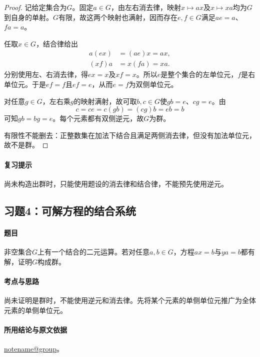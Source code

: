 \documentclass[UTF8,a4paper,11pt,fontset=windows]{ctexart}
\makeatletter
\newcommand{\noteref}[1]{\hyperref[note:#1]{\csname notename@#1\endcsname}}
\newcommand{\exref}[2]{\hyperref[ex:#1:#2]{第#1章习题#2}}
\makeatother
\begin{document}
\begin{proof}
记给定集合为$G$。固定$a\in G$，由左右消去律，映射$x\mapsto ax$及$x\mapsto xa$均为$G$到自身的单射。$G$有限，故这两个映射也满射，因而存在$e,f\in G$满足$ae=a$、$fa=a$。

任取$x\in G$，结合律给出
\begin{align*}
a(ex)&=(ae)x=ax,\\
(xf)a&=x(fa)=xa.
\end{align*}
分别使用左、右消去律，得$ex=x$及$xf=x$。所以$e$是整个集合的左单位元，$f$是右单位元。于是$ef=f$且$ef=e$，从而$e=f$为双侧单位元。

对任意$g\in G$，左右乘$g$的映射满射，故可取$b,c\in G$使$gb=e$、$cg=e$。由
\[
c=ce=c(gb)=(cg)b=eb=b
\]
可知$gb=bg=e$。每个元素都有双侧逆元，故$G$为群。

有限性不能删去：正整数集在加法下结合且满足两侧消去律，但没有加法单位元，故不是群。
\end{proof}

\paragraph{复习提示}
尚未构造出群时，只能使用题设的消去律和结合律，不能预先使用逆元。


\subsection{习题4：\texorpdfstring{可解方程的结合系统}{可解方程的结合系统}}
\label{ex:1:4}

\paragraph{题目}
非空集合$G$上有一个结合的二元运算。若对任意$a,b\in G$，方程$ax=b$与$ya=b$都有解，证明$G$构成群。

\paragraph{考点与思路}
尚未证明是群时，不能使用逆元和消去律。先将某个元素的单侧单位元推广为全体元素的单侧单位元。

\paragraph{所用结论与原文依据}
\noteref{group}。

\end{document}
